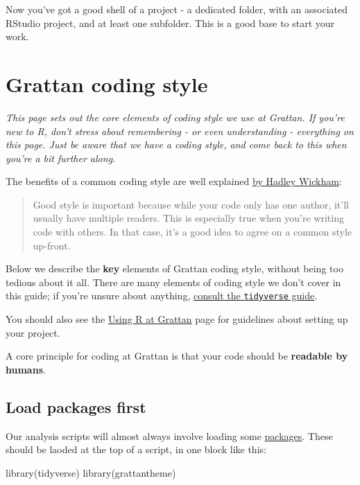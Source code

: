 \documentclass[
]{book}
\newenvironment{Shaded}{\begin{snugshade}}{\end{snugshade}}
\newcommand{\FunctionTok}[1]{\textcolor[rgb]{0.00,0.00,0.00}{#1}}
\newcommand{\NormalTok}[1]{#1}
\begin{document}
Now you've got a good shell of a project - a dedicated folder, with an associated RStudio project, and at least one subfolder. This is a good base to start your work.

\hypertarget{coding-style}{%
\chapter{Grattan coding style}\label{coding-style}}

\emph{This page sets out the core elements of coding style we use at Grattan. If you're new to R, don't stress about remembering - or even understanding - everything on this page. Just be aware that we have a coding style, and come back to this when you're a bit further along.}

The benefits of a common coding style are well explained \href{http://r-pkgs.had.co.nz/style.html}{by Hadley Wickham}:

\begin{quote}
Good style is important because while your code only has one author, it'll usually have multiple readers. This is especially true when you're writing code with others. In that case, it's a good idea to agree on a common style up-front.
\end{quote}

Below we describe the \textbf{key} elements of Grattan coding style, without being too tedious about it all. There are many elements of coding style we don't cover in this guide; if you're unsure about anything, \href{https://style.tidyverse.org/}{consult the \texttt{tidyverse} guide}.

You should also see the \protect\hyperlink{organising-projects}{Using R at Grattan} page for guidelines about setting up your project.

A core principle for coding at Grattan is that your code should be \textbf{readable by humans}.

\hypertarget{load-packages-first}{%
\section{Load packages first}\label{load-packages-first}}

Our analysis scripts will almost always involve loading some \protect\hyperlink{packages}{packages}. These should be laoded at the top of a script, in one block like this:

\begin{Shaded}
\begin{Highlighting}[]
\FunctionTok{library}\NormalTok{(tidyverse)}
\FunctionTok{library}\NormalTok{(grattantheme)}
\end{Highlighting}
\end{Shaded}
\end{document}
